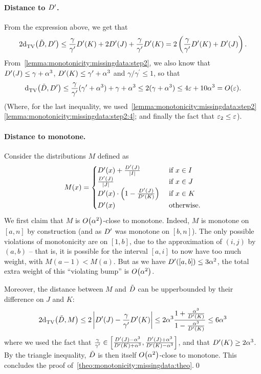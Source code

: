 \paragraph{Distance to $D^\prime$.} From the expression above, we get that
\[
2{\operatorname{d}_{\textrm{TV}}^{}\!\left({\tilde{D}, D^\prime}\right)} \leq \frac{\gamma}{\gamma^\prime} D^\prime(K) +  2D^\prime(J) + \frac{\gamma}{\gamma^\prime} D^\prime(K) = 2\left(\frac{\gamma}{\gamma^\prime} D^\prime(K) + D^\prime(J) \right).
\] 
From~\autoref{lemma:monotonicity:missingdata:step2}, we also know that $D^\prime(J) \leq \gamma+\alpha^3$, $D^\prime(K) \leq \gamma^\prime+\alpha^3$ and $\gamma/\gamma^\prime \leq 1$, so that
\[
\totalvardist{\tilde{\D}}{\D^\prime} \leq \frac{\gamma}{\gamma^\prime} (\gamma^\prime+\alpha^3) + \gamma+\alpha^3 \leq 2(\gamma+\alpha^3) \leq 4\eps+10\alpha^3 = \bigO{\eps}.
\] 
(Where, for the last inequality, we used~\autoref{lemma:monotonicity:missingdata:step2} \ref{lemma:monotonicity:missingdata:step2:4}; and finally the fact that $\varepsilon_2\leq \varepsilon$).

\paragraph{Distance to monotone.}

Consider the distributions $M$ defined as
\[
M(x) = \begin{cases}
 D^\prime(x) + \frac{D^\prime(J)}{\left\lvert I \right\rvert} & \text{ if } x\in I \\
 \frac{D^\prime(J)}{\left\lvert J \right\rvert} & \text{ if } x\in J \\
 D^\prime(x)\cdot\left(1-\frac{D^\prime(J)}{D^\prime(K)}\right) & \text{ if } x\in K \\
 D^\prime(x) & \text{ otherwise.}
\end{cases}
\]
We first claim that $M$ is $\bigO{\alpha^2}$-close to monotone. Indeed, $M$ is monotone on $[a,n]$ by construction (and as $D^\prime$ was monotone on $[b,n]$). The only possible violations of monotonicity are on $[1,b]$, due to the approximation of $(i,j)$ by $(a,b)$ -- that is, it is possible for the interval $[a,i]$ to now have too much weight, with $M(a-1) < M(a)$. But as we have $D^\prime([a,b])\leq 3\alpha^2$, the total extra weight of this ``violating bump'' is $\bigO{\alpha^2}$.\medskip

Moreover, the distance between $M$ and $\tilde{D}$ can be upperbounded by their difference on $J$ and $K$:
\begin{align*}
  2{\operatorname{d}_{\textrm{TV}}^{}\!\left({\tilde{D}, M}\right)} \leq 2\left\lvert  D^\prime(J) - \frac{\gamma}{\gamma^\prime} D^\prime(K)  \right\rvert \leq 2\alpha^3\frac{1+\frac{\alpha^3}{D^\prime(K)}}{1-\frac{\alpha^3}{D^\prime(K)}} \leq 6\alpha^3
\end{align*}
where we used the fact that $\frac{\gamma}{\gamma^\prime} \in \left[\frac{D^\prime(J)-\alpha^3}{D^\prime(K) + \alpha^3}, \frac{D^\prime(J)+\alpha^3}{D^\prime(K) - \alpha^3}\right]$, and that $D^\prime(K) \geq 2\alpha^3$. By the triangle inequality, $\tilde{D}$ is then itself $\bigO{\alpha^2}$-close to monotone. This concludes the proof of~\autoref{theo:monotonicity:missingdata:theo}.\qed
